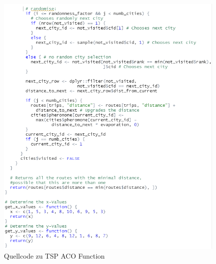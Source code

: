 \begin{figure}[h]
 \centering
 \includegraphics[scale=.6]{"images/05_Tsp/fct_aco_tsp2.png"}
 \caption{Quellcode zu TSP ACO Function}
 \label{actionButtonPhasen}
\end{figure}

